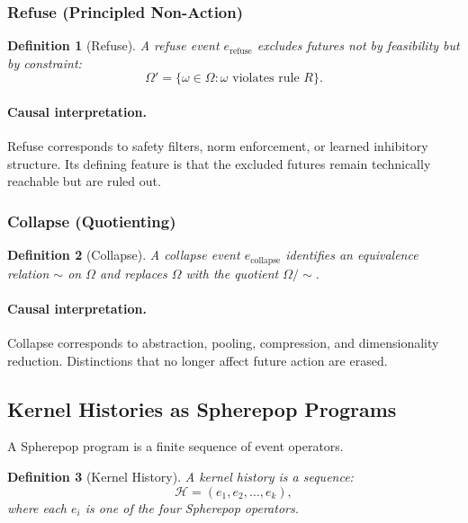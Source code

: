 \documentclass[11pt]{article}
\newtheorem{definition}{Definition}
\theoremstyle{remark}
\newcommand{\Hist}{\mathcal{H}}
\begin{document}
\subsubsection{Refuse (Principled Non-Action)}

\begin{definition}[Refuse]
A refuse event $e_{\text{refuse}}$ excludes futures not by feasibility
but by constraint:
\[
\Omega' = \{ \omega \in \Omega : \omega \text{ violates rule } R \}.
\]
\end{definition}

\paragraph{Causal interpretation.}
Refuse corresponds to safety filters, norm enforcement, or learned
inhibitory structure. Its defining feature is that the excluded futures
remain technically reachable but are ruled out.

\subsubsection{Collapse (Quotienting)}

\begin{definition}[Collapse]
A collapse event $e_{\text{collapse}}$ identifies an equivalence
relation $\sim$ on $\Omega$ and replaces $\Omega$ with the quotient
$\Omega/{\sim}$.
\end{definition}

\paragraph{Causal interpretation.}
Collapse corresponds to abstraction, pooling, compression, and
dimensionality reduction. Distinctions that no longer affect future
action are erased.

\subsection{Kernel Histories as Spherepop Programs}

A Spherepop program is a finite sequence of event operators.

\begin{definition}[Kernel History]
A kernel history is a sequence:
\[
\Hist = (e_1, e_2, \ldots, e_k),
\]
where each $e_i$ is one of the four Spherepop operators.
\end{definition}
\end{document}
